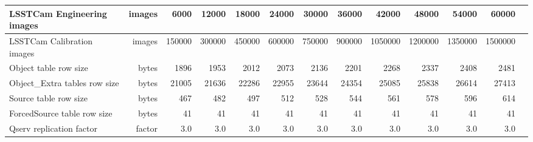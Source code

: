 \begin{longtable} { |p{}  |r  |r  |r  |r  |r  |r  |r  |r  |r  |r  |r  |r |}
{LSSTCam Engineering images}&{images}&{6000}&{12000}&{18000}&{24000}&{30000}&{36000}&{42000}&{48000}&{54000}&{60000} \\ \hline
{LSSTCam Calibration images}&{images}&{150000}&{300000}&{450000}&{600000}&{750000}&{900000}&{1050000}&{1200000}&{1350000}&{1500000} \\ \hline
{Object table row size}&{bytes}&{1896}&{1953}&{2012}&{2073}&{2136}&{2201}&{2268}&{2337}&{2408}&{2481} \\ \hline
{Object\_Extra tables row size}&{bytes}&{21005}&{21636}&{22286}&{22955}&{23644}&{24354}&{25085}&{25838}&{26614}&{27413} \\ \hline
{Source table row size}&{bytes}&{467}&{482}&{497}&{512}&{528}&{544}&{561}&{578}&{596}&{614} \\ \hline
{ForcedSource table row size}&{bytes}&{41}&{41}&{41}&{41}&{41}&{41}&{41}&{41}&{41}&{41} \\ \hline
{Qserv replication factor}&{factor}&{3.0}&{3.0}&{3.0}&{3.0}&{3.0}&{3.0}&{3.0}&{3.0}&{3.0}&{3.0} \\ \hline
\end{longtable} \normalsize
